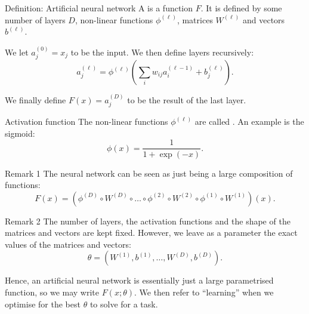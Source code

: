 \documentclass[a4paper]{article}
\begin{document}
\begin{parag}{Definition: Artificial neural network}
    A  is a function $F$. It is defined by some number of layers $D$, non-linear functions $\phi^{\left(\ell\right)}$, matrices $W^{\left(\ell\right)}$ and vectors $b^{\left(\ell\right)}$.

    We let $a_j^{\left(0\right)} = x_j$ to be the input. We then define layers recursively: 
    \[a_j^{\left(\ell\right)} = \phi^{\left(\ell\right)}\left(\sum_{i} w_{ij} a_i^{\left(\ell-1\right)} + b^{\left(\ell\right)}_j\right).\]

    We finally define $F\left(x\right) = a_j^{\left(D\right)}$ to be the result of the last layer.

    \begin{subparag}{Activation function}
        The non-linear functions $\phi^{\left(\ell\right)}$ are called . An example is the sigmoid: 
        \[\phi\left(x\right) = \frac{1}{1 + \exp\left(-x\right)}.\]
    \end{subparag}

    \begin{subparag}{Remark 1}
        The neural network can be seen as just being a large composition of functions: 
        \[F\left(x\right) = \left(\phi^{\left(D\right)} \circ W^{\left(D\right)} \circ \ldots \circ \phi^{\left(2\right)} \circ W^{\left(2\right)} \circ \phi^{\left(1\right)} \circ W^{\left(1\right)}\right)\left(x\right).\]
    \end{subparag}

    \begin{subparag}{Remark 2}
        The number of layers, the activation functions and the shape of the matrices and vectors are kept fixed. However, we leave as a parameter the exact values of the matrices and vectors: 
        \[\theta = \left(W^{\left(1\right)}, b^{\left(1\right)}, \ldots, W^{\left(D\right)}, b^{\left(D\right)}\right).\]
        
        Hence, an artificial neural network is essentially just a large parametrised function, so we may write $F\left(x; \theta\right)$. We then refer to ``learning'' when we optimise for the best $\theta$ to solve for a task.
    \end{subparag}
\end{parag}
\end{document}
